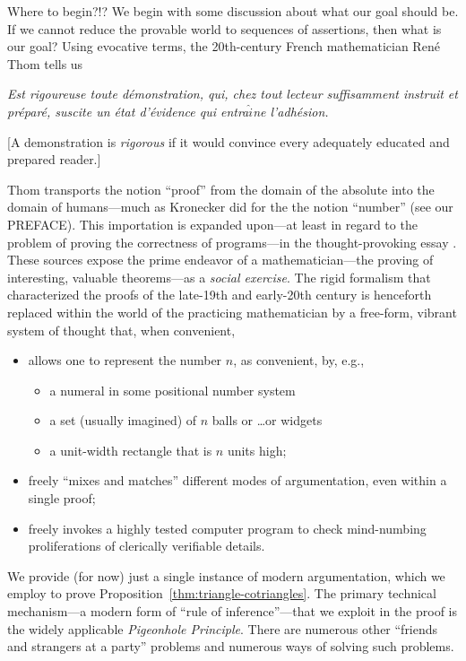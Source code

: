 Where to begin?!?  We begin with some discussion about what our goal
should be.  If we cannot reduce the provable world to sequences of
assertions, then what is our goal?  Using evocative terms, the
20th-century French mathematician Ren\'{e} Thom 
tells us

\bigskip

\begin{minipage}{0.95\textwidth}
{\em Est rigoureuse toute d\'{e}monstration, qui, chez tout lecteur
  suffisamment instruit et pr\'{e}par\'{e}, suscite un \'{e}tat
  d'\'{e}vidence qui entra$\hat{i}$ne l'adh\'{e}sion.}

\smallskip

[A demonstration is {\em rigorous} if it would convince every
adequately educated and prepared reader.]
\end{minipage}

\bigskip

\noindent
Thom transports the notion ``proof'' from the domain of the absolute
into the domain of humans---much as Kronecker did for the the notion
``number'' (see our PREFACE).  This importation is expanded upon---at
least in regard to the problem of proving the correctness of
programs---in the thought-provoking essay \cite{DeMilloLP79}.  These
sources expose the prime endeavor of a mathematician---the proving of
interesting, valuable theorems---as a {\em social exercise}.  The
rigid formalism that characterized the proofs of the late-19th and
early-20th century is henceforth replaced within the world of the
practicing mathematician by a free-form, vibrant system of thought
that, when convenient,
\begin{itemize}
\item
allows one to represent the number $n$, as convenient, by, e.g.,
  \begin{itemize}
  \item
a numeral in some positional number system
  \item
a set (usually imagined) of $n$ balls or \ldots or widgets
  \item
a unit-width rectangle that is $n$ units high;
  \end{itemize}

\item
freely ``mixes and matches'' different modes of argumentation, even
within a single proof;

\item
freely invokes a highly tested computer program to check mind-numbing
proliferations of clerically verifiable details.
\end{itemize}
We provide (for now) just a single instance of modern argumentation,
which we employ to prove Proposition~\ref{thm:triangle-cotriangles}.
The primary technical mechanism---a modern form of ``rule of
inference''---that we exploit in the proof is the widely applicable
{\it Pigeonhole Principle}.  There are
numerous other ``friends and strangers at a party'' problems and
numerous ways of solving such problems.

